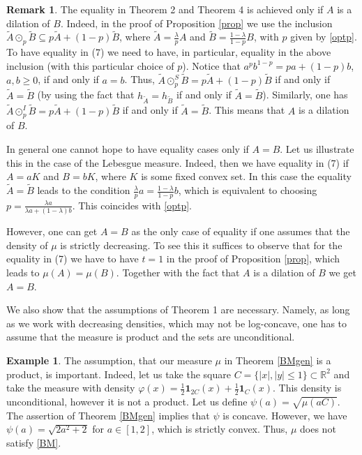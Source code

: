 \documentclass[11pt]{article}
\newcommand{\mb}[1]{\mathbb{{#1}}}
\newcommand{\1}{\mathbf{{1}}}
\newcommand{\vp}{\varphi}
\theoremstyle{definition}
\newtheorem{rem}{Remark}
\newtheorem{ex}{Example}
\begin{document}
\begin{rem}
The equality in Theorem 2 and Theorem 4 is achieved only if $A$ is a dilation of $B$. Indeed, in the proof of Proposition \ref{prop} we use the inclusion $\tilde{A} \odot_p \tilde{B} \subseteq p \tilde{A} + (1-p) \tilde{B}$, where $\tilde{A}=\frac{\lambda}{p}A$ and $\tilde{B}=\frac{1-\lambda}{1-p}B$, with $p$ given by \eqref{optp}. To have equality in (7) we need to have, in particular, equality in the above inclusion (with this particular choice of $p$). Notice that $a^pb^{1-p}=pa+(1-p)b$, $a,b \geq 0$, if and only if $a=b$. Thus, $\tilde{A} \odot_p^S \tilde{B} = p \tilde{A} + (1-p) \tilde{B}$ if and only if $\tilde{A}=\tilde{B}$ (by using the fact that $h_{\tilde{A}}=h_{\tilde{B}}$ if and only if $\tilde{A}=\tilde{B}$). Similarly, one has $\tilde{A} \odot_p^I \tilde{B} = p \tilde{A} + (1-p) \tilde{B}$ if and only if $\tilde{A}=\tilde{B}$. This means that $A$ is a dilation of $B$.

In general one cannot hope to have equality cases only if $A=B$. Let us illustrate this in the case of the Lebesgue measure. Indeed, then we have equality in (7) if $A=aK$ and $B=bK$, where $K$ is some fixed convex set. In this case the equality $\tilde{A}=\tilde{B}$ leads to the condition $\frac{\lambda}{p}a=\frac{1-\lambda}{1-p}b$, which is equivalent to choosing $p=\frac{\lambda a}{\lambda a + (1-\lambda)b}$. This coincides with \eqref{optp}.

However, one can get $A=B$ as the only case of equality if one assumes that the density of $\mu$ is strictly decreasing. To see this it suffices to observe that for the equality in (7) we have to have $t=1$ in the proof of Proposition \ref{prop}, which leads to $\mu(A)=\mu(B)$. Together with the fact that $A$ is a dilation of $B$ we get $A=B$.
\end{rem}

We also show that the assumptions of Theorem 1 are necessary. Namely, as long as we work with decreasing densities, which may not be log-concave, one has to assume that the measure is product and the sets are unconditional.

\begin{ex}\label{ex1}
The assumption, that our measure $\mu$ in Theorem \ref{BMgen} is a product, is important. Indeed, let us take the square $C=\{|x|,|y| \leq 1\} \subset \mb{R}^2$ and take the measure with density $\vp(x)=\frac12 \1_{2C}(x)+\frac12 \1_{C}(x)$. This density is unconditional, however it is not a product. Let us define $\psi(a)=\sqrt{\mu(aC)}$. The assertion of Theorem \ref{BMgen} implies that $\psi$ is concave. However, we have $\psi(a)=\sqrt{2a^2+2}$ for $a \in [1,2]$, which is strictly convex. Thus, $\mu$ does not satisfy \eqref{BM}.
\end{ex}
\end{document}
